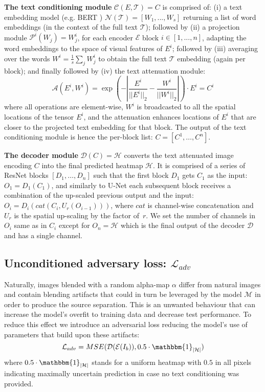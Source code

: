 \documentclass[10pt,twocolumn,letterpaper]{article}
\newcommand\secvspace{\vspace{-0.0cm}}
\begin{document}
\noindent\textbf{The text conditioning module} $\mathcal{C}(E, \mathcal{T})=C$ is comprised of: (i) a text embedding model (e.g. 
BERT \cite{devlin2018bert}) $\mathcal{N}(\mathcal{T}) = [W_1, ..., W_s]$ returning a list of word embeddings (in the context of the full text $\mathcal{T}$); followed by (ii) a projection module $\mathcal{P}^i(W_j) = W_j^i$, for each encoder $\mathcal{E}$ block $i \in [1,...,n]$, adapting the word embeddings to the space of visual features of $E^i$; followed by (iii) averaging over the words $W^i = \frac{1}{s}\sum_{j}{W_j^i}$ to obtain the full text $\mathcal{T}$ embedding (again per block); and finally followed by (iv) the text attenuation module: 
\begin{equation}
    \mathcal{A}(E^i,W^i) = \exp\left(-\left|\frac{E^i}{||E^i||_2} - \frac{W^i}{||W^i||_2}\right|\right) \cdot E^i = C^i
\label{eq:atten}
\end{equation}
where all operations are element-wise, $W^i$ is broadcasted to all the spatial locations of the tensor $E^i$, and the attenuation enhances locations of $E^i$ that are closer to the projected text embedding for that block. The output of the text conditioning module is hence the per-block list: $C = [C^1,\ldots, C^n]$.

\noindent\textbf{The decoder module}  $\mathcal{D}(C) = \mathcal{H}$ converts the text attenuated image encoding $C$ into the final predicted heatmap $\mathcal{H}$. It is comprised of a series of ResNet \cite{he2016deep} blocks $[D_1,\ldots,D_n]$ such that the first block $D_1$ gets $C_1$ as the input:~$O_1 = D_1(C_1)$, and similarly to U-Net \cite{ronneberger2015unet} each subsequent block receives a combination of the up-scaled previous output and the input:~$O_i=D_i(cat(C_i, U_r(O_{i-1})))$, where $cat$ is channel-wise concatenation and $U_r$ is the spatial up-scaling by the factor of~$r$. We set the number of channels in $O_i$ same as in $C_i$ except for $O_n=\mathcal{H}$ which is the final output of the decoder $\mathcal{D}$ and has a single channel.

\secvspace
\subsection{Unconditioned adversary loss: $\mathcal{L}_{adv}$}\label{sec:adv}
\secvspace
Naturally, images blended with a random alpha-map $\alpha$ differ from natural images and contain blending artifacts that could in turn be leveraged by the model $\mathcal{M}$ in order to produce the source separation. This is an unwanted behaviour that can increase the model's overfit to training data and decrease test performance. To reduce this effect we introduce an adversarial loss reducing the model's use of parameters that build upon these artifacts:
\begin{equation}
    \mathcal{L}_{adv} = MSE(\mathcal{D}(\mathcal{E}(I_b)), 0.5 \cdot \mathbbm{1}_{|\mathcal{H}|})
\end{equation}
where $0.5 \cdot \mathbbm{1}_{|\mathcal{H}|}$ stands for a uniform heatmap with $0.5$ in all pixels indicating maximally uncertain prediction in case no text conditioning was provided. 
\end{document}
